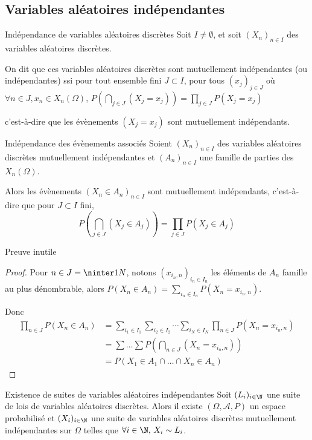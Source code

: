 \subsection{Variables aléatoires indépendantes }

\begin{definition}{Indépendance de variables aléatoires discrètes}{}
    Soit $I \neq \emptyset$, et soit $(X_n)_{n \in I}$ des variables aléatoires discrètes. 

    On dit que ces variables aléatoires discrètes sont mutuellement indépendantes
    (ou indépendantes) ssi pour tout ensemble fini $J \subset I$, pour tous 
    $(x_j)_{j \in J}$ où $\forall n \in J, x_n \in X_n(\Omega)$, 
    $\displaystyle P\left( \bigcap_{j \in J} (X_j = x_j) \right) = \prod_{j \in J} P(X_j = x_j)$

    c'est-à-dire que les évènements $(X_j = x_j)$ sont mutuellement indépendants.
\end{definition}


\begin{proposition}{Indépendance des évènements associés}{}
    Soient $(X_n)_{n \in I}$ des variables aléatoires discrètes mutuellement indépendantes et 
    $(A_n)_{n \in I}$ une famille de parties des $X_n(\Omega)$. 

    Alors les évènements $(X_n \in A_n)_{n \in I}$ sont mutuellement indépendants, c'est-à-dire que pour 
    $J \subset I$ fini, $$ P\left( \bigcap_{j \in J} (X_j \in A_j) \right) = \prod_{j \in J} P(X_j \in A_j) $$
\end{proposition}

Preuve inutile 
 
\begin{proof}
    Pour $n \in J = \ninter 1 N$, notons 
    $(x_{i_n, n})_{i_n \in I_n}$ les éléments de $A_n$ famille au plus dénombrable, alors 
    $P(X_n \in A_n) = \sum_{i_n \in I_n} P(X_n = x_{i_n, n})$.

    Donc 
    \begin{align}
        \prod_{n \in J} P(X_n \in A_n) & = \sum_{i_1 \in I_1} \sum_{i_2 \in I_2} \cdots \sum_{i_N \in I_N} \prod_{n \in J} P(X_n = x_{i_n, n}) \\
        & = \sum \dots \sum P(\bigcap_{n \in J} (X_n = x_{i_n, n})) \\
        & = P(X_1 \in A_1 \cap \dots \cap X_n \in A_n)
    \end{align}
\end{proof}

\begin{theoreme}{Existence de suites de variables aléatoires indépendantes}{}
    Soit $(L_i)_{i \in \N}$ une suite de lois de variables aléatoires discrètes. Alors il existe 
    $(\Omega, \mathcal A, P)$ un espace probabilisé et $(X_i)_{i \in \N}$ une suite de variables aléatoires discrètes mutuellement indépendantes
    sur $\Omega$ telles que $\forall i \in \N, \, X_i \sim L_i$. 
\end{theoreme}

